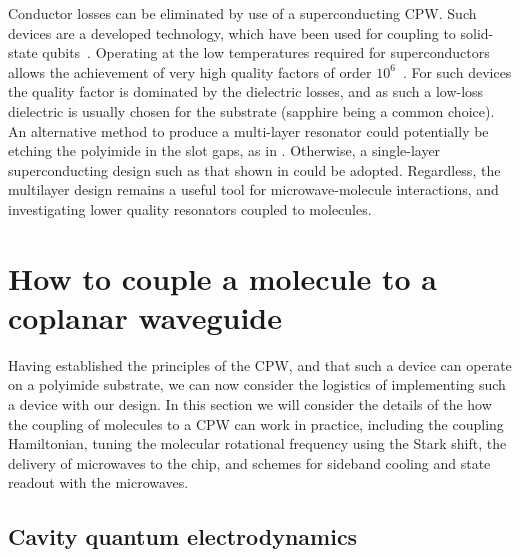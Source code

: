 Conductor losses can be eliminated by use of a superconducting CPW. Such
devices are a developed technology, which have been used for coupling to
solid-state qubits~\cite{Wallraff2004}. Operating at the low temperatures
required for superconductors allows the achievement of very high quality
factors of order $10^6$~\cite{doi:10.1063/1.3552890, Day2003}. For such devices
the quality factor is dominated by the dielectric losses, and as such a
low-loss dielectric is usually chosen for the substrate (sapphire being a
common choice). An alternative method to produce a multi-layer resonator could
potentially be etching the polyimide in the slot gaps, as in
. Otherwise, a single-layer superconducting design such as
that shown in  could be adopted. Regardless, the
multilayer design remains a useful tool for microwave-molecule interactions,
and investigating lower quality resonators coupled to molecules. 


\section{How to couple a molecule to a coplanar waveguide}
\label{mws:coupling}

Having established the principles of the CPW, and that such a device can
operate on a polyimide substrate, we can now consider the logistics of
implementing such a device with our design. In this section we will consider
the details of the how the coupling of molecules to a CPW can work in practice,
including the coupling Hamiltonian, tuning the molecular rotational frequency
using the Stark shift,  the delivery of microwaves to the chip, and
schemes for sideband cooling and state readout with the microwaves.

\subsection{Cavity quantum electrodynamics}
\label{mws:CQED}

